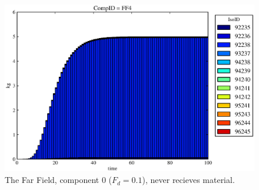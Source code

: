 \begin{figure}[ht]
\begin{minipage}[b]{0.45\linewidth}
  \includegraphics[width=\textwidth]{./chapters/demonstration/no_release/mcIII0.eps}
  \caption[Case MCI Waste Package Contaminants.]{ 
    The Far Field, component 0 ($F_d = 0.1$), never recieves material.
    }
  \label{fig:mcIIIff0}


  \end{minipage}
\end{figure}


